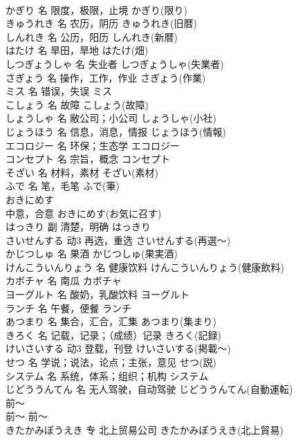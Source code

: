\documentclass[8pt]{extreport}
\begin{document}
\begin{CJK}{UTF8}{min}
\\	かぎり	名	限度，极限，止境	かぎり(限り)	
\\	きゅうれき	名	农历，阴历	きゅうれき(旧暦)	
\\	しんれき	名	公历，阳历	しんれき(新暦)	
\\	はたけ	名	旱田，旱地	はたけ(畑)	
\\	しつぎょうしゃ	名	失业者	しつぎょうしゃ(失業者)	
\\	さぎょう	名	操作，工作，作业	さぎょう(作業)	
\\	ミス	名	错误，失误	ミス	
\\	こしょう	名	故障	こしょう(故障)	
\\	しょうしゃ	名	敝公司；小公司	しょうしゃ(小社)	
\\	じょうほう	名	信息，消息，情报	じょうほう(情報)	
\\	エコロジー	名	环保；生态学	エコロジー	
\\	コンセプト	名	宗旨，概念	コンセプト	
\\	そざい	名	材料，素材	そざい(素材)	
\\	ふで	名	笔，毛笔	ふで(筆)	
\\	おきにめす	
\\	中意，合意	おきにめす(お気に召す)	
\\	はっきり	副	清楚，明确	はっきり	
\\	さいせんする	动3	再选，重选	さいせんする(再選～)	
\\	かじつしゅ	名	果酒	かじつしゅ(果実酒)	
\\	けんこういんりょう	名	健康饮料	けんこういんりょう(健康飲料)	
\\	カボチャ	名	南瓜	カボチャ	
\\	ヨーグルト	名	酸奶，乳酸饮料	ヨーグルト	
\\	ランチ	名	午餐，便餐	ランチ	
\\	あつまり	名	集合，汇合，汇集	あつまり(集まり)	
\\	きろく	名	记载，记录；（成绩）记录	きろく(記録)	
\\	けいさいする	动3	登载，刊登	けいさいする(掲載～)	
\\	せつ	名	学说；说法，论点；主张，意见	せつ(説)	
\\	システム	名	系统，体系；组织；机构	システム	
\\	じどううんてん	名	无人驾驶，自动驾驶	じどううんてん(自動運転)	
\\	前～	
\\	前～	前～	
\\	きたかみぼうえき	专	北上贸易公司	きたかみぼうえき(北上貿易)	

\end{CJK}
\end{document}
